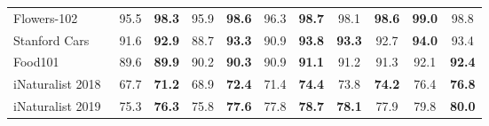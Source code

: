 \begin{table*}
{\begin{tabular}{|l|cc|cc|cc|cc|cc|}
\midrule
	Flowers-102~\cite{Nilsback08}               & 95.5 & \textbf{98.3}  & 95.9 & \textbf{98.6} & 96.3 & \textbf{98.7} & 98.1 & \textbf{98.6}  & \textbf{99.0} & 98.8\\
	Stanford Cars~\cite{Cars2013}               & 91.6 & \textbf{92.9}  & 88.7 & \textbf{93.3}  & 90.9 & \textbf{93.8}   & \textbf{93.3} & 92.7  & \textbf{94.0} & 93.4\\ 
	Food101~\cite{bossard14Food101}             & 89.6 & \textbf{89.9} & 90.2 & \textbf{90.3}  & 90.9 & \textbf{91.1}  & 91.2 & 91.3 & 92.1 & \textbf{92.4}\\
	iNaturalist 2018~\cite{Horn2018INaturalist}&  67.7 & \textbf{71.2}  & 68.9 & \textbf{72.4} & 71.4 & \textbf{74.4}  & 73.8 & \textbf{74.2} & 76.4 & \textbf{76.8}\\
	iNaturalist 2019~\cite{Horn2019INaturalist} & 75.3 & \textbf{76.3} & 75.8 & \textbf{77.6}  & 77.8 & \textbf{78.7}   & \textbf{78.1} & 77.9 & 79.8 & \textbf{80.0}\\

  \bottomrule
\end{tabular}}
\end{table*}
 
